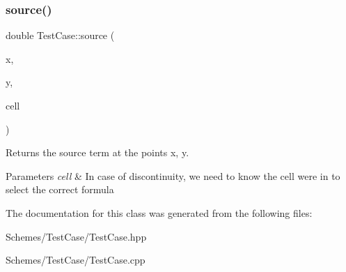 \subsubsection{\texorpdfstring{source()}{source()}}
{\footnotesize\ttfamily double Test\+Case\+::source (\begin{DoxyParamCaption}\item[{const double}]{x,  }\item[{const double}]{y,  }\item[{const \hyperlink{classHArDCore2D_1_1Cell}{Cell} $\ast$}]{cell }\end{DoxyParamCaption})}



Returns the source term at the points x, y. 


\begin{DoxyParams}{Parameters}
{\em cell} & In case of discontinuity, we need to know the cell we\textquotesingle{}re in to select the correct formula \\
\hline
\end{DoxyParams}


The documentation for this class was generated from the following files\+:\begin{DoxyCompactItemize}
\item 
Schemes/\+Test\+Case/Test\+Case.\+hpp\item 
Schemes/\+Test\+Case/Test\+Case.\+cpp\end{DoxyCompactItemize}
